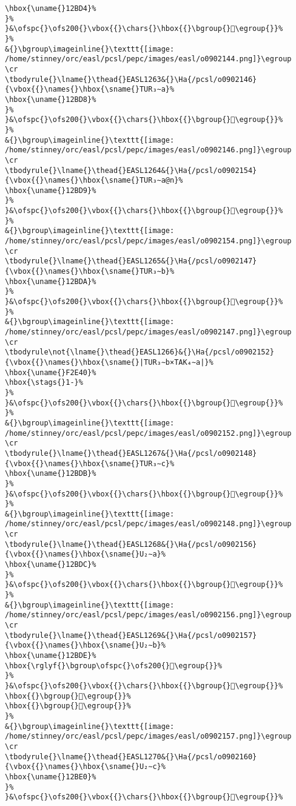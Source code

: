 \begin{verbatim}
\hbox{\uname{}12BD4}%
}%
}&\ofspc{}\ofs200{}\vbox{{}\chars{}\hbox{{}\bgroup{}𒯔\egroup{}}%
}%
&{}\bgroup\imageinline{}\texttt{[image: /home/stinney/orc/easl/pcsl/pepc/images/easl/o0902144.png]}\egroup
\cr
\tbodyrule{}\lname{}\thead{}EASL1263&{}\Ha{/pcsl/o0902146}{\vbox{{}\names{}\hbox{\sname{}TUR₃∼a}%
\hbox{\uname{}12BD8}%
}%
}&\ofspc{}\ofs200{}\vbox{{}\chars{}\hbox{{}\bgroup{}𒯘\egroup{}}%
}%
&{}\bgroup\imageinline{}\texttt{[image: /home/stinney/orc/easl/pcsl/pepc/images/easl/o0902146.png]}\egroup
\cr
\tbodyrule{}\lname{}\thead{}EASL1264&{}\Ha{/pcsl/o0902154}{\vbox{{}\names{}\hbox{\sname{}TUR₃∼a@n}%
\hbox{\uname{}12BD9}%
}%
}&\ofspc{}\ofs200{}\vbox{{}\chars{}\hbox{{}\bgroup{}𒯙\egroup{}}%
}%
&{}\bgroup\imageinline{}\texttt{[image: /home/stinney/orc/easl/pcsl/pepc/images/easl/o0902154.png]}\egroup
\cr
\tbodyrule{}\lname{}\thead{}EASL1265&{}\Ha{/pcsl/o0902147}{\vbox{{}\names{}\hbox{\sname{}TUR₃∼b}%
\hbox{\uname{}12BDA}%
}%
}&\ofspc{}\ofs200{}\vbox{{}\chars{}\hbox{{}\bgroup{}𒯚\egroup{}}%
}%
&{}\bgroup\imageinline{}\texttt{[image: /home/stinney/orc/easl/pcsl/pepc/images/easl/o0902147.png]}\egroup
\cr
\tbodyrule\not{\lname{}\thead{}EASL1266}&{}\Ha{/pcsl/o0902152}{\vbox{{}\names{}\hbox{\sname{}|TUR₃∼b×TAK₄∼a|}%
\hbox{\uname{}F2E40}%
\hbox{\stags{}1-}%
}%
}&\ofspc{}\ofs200{}\vbox{{}\chars{}\hbox{{}\bgroup{}󲹀\egroup{}}%
}%
&{}\bgroup\imageinline{}\texttt{[image: /home/stinney/orc/easl/pcsl/pepc/images/easl/o0902152.png]}\egroup
\cr
\tbodyrule{}\lname{}\thead{}EASL1267&{}\Ha{/pcsl/o0902148}{\vbox{{}\names{}\hbox{\sname{}TUR₃∼c}%
\hbox{\uname{}12BDB}%
}%
}&\ofspc{}\ofs200{}\vbox{{}\chars{}\hbox{{}\bgroup{}𒯛\egroup{}}%
}%
&{}\bgroup\imageinline{}\texttt{[image: /home/stinney/orc/easl/pcsl/pepc/images/easl/o0902148.png]}\egroup
\cr
\tbodyrule{}\lname{}\thead{}EASL1268&{}\Ha{/pcsl/o0902156}{\vbox{{}\names{}\hbox{\sname{}U₂∼a}%
\hbox{\uname{}12BDC}%
}%
}&\ofspc{}\ofs200{}\vbox{{}\chars{}\hbox{{}\bgroup{}𒯜\egroup{}}%
}%
&{}\bgroup\imageinline{}\texttt{[image: /home/stinney/orc/easl/pcsl/pepc/images/easl/o0902156.png]}\egroup
\cr
\tbodyrule{}\lname{}\thead{}EASL1269&{}\Ha{/pcsl/o0902157}{\vbox{{}\names{}\hbox{\sname{}U₂∼b}%
\hbox{\uname{}12BDE}%
\hbox{\rglyf{}\bgroup\ofspc{}\ofs200{}𒯞\egroup{}}%
}%
}&\ofspc{}\ofs200{}\vbox{{}\chars{}\hbox{{}\bgroup{}𒯝\egroup{}}%
\hbox{{}\bgroup{}𒯞\egroup{}}%
\hbox{{}\bgroup{}𒯟\egroup{}}%
}%
&{}\bgroup\imageinline{}\texttt{[image: /home/stinney/orc/easl/pcsl/pepc/images/easl/o0902157.png]}\egroup
\cr
\tbodyrule{}\lname{}\thead{}EASL1270&{}\Ha{/pcsl/o0902160}{\vbox{{}\names{}\hbox{\sname{}U₂∼c}%
\hbox{\uname{}12BE0}%
}%
}&\ofspc{}\ofs200{}\vbox{{}\chars{}\hbox{{}\bgroup{}𒯠\egroup{}}%

\end{verbatim}
